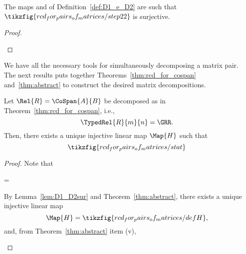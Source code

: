 \documentclass[manyauthors]{fundam}
\begin{document}
\begin{lemma}\label{lem:D1_D2sur} The maps  and  of Definition~\ref{def:D1_e_D2} are such that $\tikzfig{rcd_for_pairs_of_matrices/step22}$ is surjective.
\end{lemma}
\begin{proof}
\begin{hcalculation}[=]{}
\end{hcalculation}
\end{proof}

We have all the necessary tools for simultaneously decomposing a matrix pair.
The next results puts together Theorems~\ref{thm:rcd_for_cospan} and~\ref{thm:abstract}
to construct the desired matrix decompositions.


\begin{theorem}
  \label{thm:rcd_for_pairs_of_matrices}
Let $\Rel{R}=\CoSpan{A}{B}$ be decomposed as in Theorem~\ref{thm:rcd_for_cospan}, i.e.,
\[\TypedRel{R}{m}{n} = \GRR.\]
Then, there exists a unique injective linear map $\Map{H}$ such that
\[\tikzfig{rcd_for_pairs_of_matrices/stat}\]
\end{theorem}

\begin{proof} Note that
\begin{hcalculation}[\iff]{ = \GRR}
\end{hcalculation}

By Lemma~\ref{lem:D1_D2sur} and Theorem~\ref{thm:abstract},
there exists a unique injective linear map
\[\Map{H}=\tikzfig{rcd_for_pairs_of_matrices/defH},\]
and, from Theorem~\ref{thm:abstract} item (v),
\begin{hcalculation}[\iff]{}
\end{hcalculation}
\end{proof}
\end{document}
